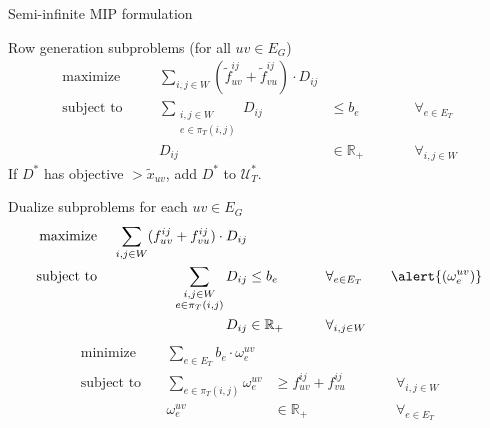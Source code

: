 \documentclass[aspectratio=149]{beamer}
\begin{document}
\begin{frame}{Semi-infinite MIP formulation}
{\begin{textblock}{1}
\begin{alertblock}{Row generation subproblems (for all $uv \in E_G$)}
\begin{alignat*}{5}
                        \text{maximize}\quad && \sum_{i,j \in W} (\tilde f_{uv}^{ij} + \tilde f_{vu}^{ij}) \cdot D_{ij} &&& \\
                        \text{subject to}\quad && \sum_{\substack{i,j \in W\\e \in \pi_T(i,j)}} D_{ij} &\le b_e &&\qquad \forall_{e \in E_T} \\
                        && D_{ij} &\in \mathbb{R}_+ &&\qquad \forall_{i,j \in W}
                    \end{alignat*}
                    If $D^*$ has objective $> \tilde x_{uv}$, add $D^*$ to $\mathcal U_T^*$.
                \end{alertblock}
            \end{textblock}%
        }%
    \end{frame}

    \begin{frame}{Dualize subproblems for each $uv \in E_G$}
        \vspace*{-1em}
        \begin{alignat*}{5}
            \text{maximize}\ && \sum_{i,j \in W} (f_{uv}^{ij} + f_{vu}^{ij}) \cdot D_{ij} &&& \\
            \text{subject to}\ && \sum_{\substack{i,j \in W\\e \in \pi_T(i,j)}} D_{ij} &\le b_e &&\qquad \forall_{e \in E_T} \qquad \alert{(\omega_e^{uv})} \\
            && D_{ij} &\in \mathbb{R}_+ &&\qquad \forall_{i,j \in W}
        \end{alignat*}
        \hrulefill
        \begin{alignat*}{5}
            \text{minimize}\ && \sum_{e \in E_T} b_e \cdot \omega_e^{uv} &&& \\
            \text{subject to}\ && \sum_{e \in \pi_T(i,j)} \omega_e^{uv} &\ge f_{uv}^{ij} + f_{vu}^{ij} &&\qquad \forall_{i,j \in W} \\
            && \omega_e^{uv} &\in \mathbb{R}_+ &&\qquad \forall_{e \in E_T}
        \end{alignat*}
    \end{frame}
\end{document}
